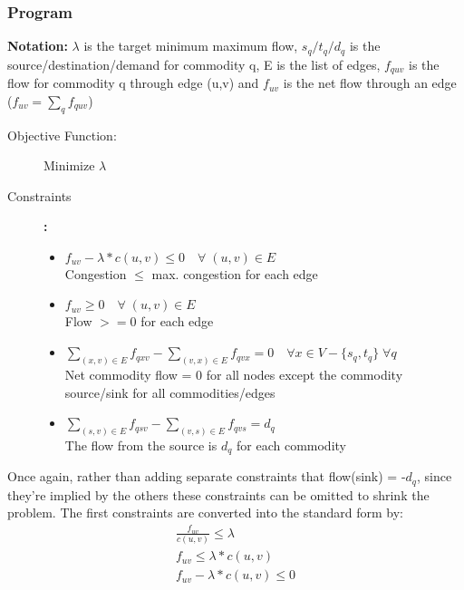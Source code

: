 \subsubsection{Program}
\textbf{Notation:} $\lambda$ is the target minimum maximum flow, $s_q/t_q/d_q$ is the source/destination/demand for commodity q, E is the list of edges, $f_{quv}$ is the flow for commodity q through edge (u,v) and $f_{uv}$ is the net flow through an edge ($f_{uv} = \sum_qf_{quv}$)
\begin{description}
\item [Objective Function:] Minimize $\lambda$
\item [Constraints]\textbf{:}  
\begin{itemize}
    \item \(f_{uv} - \lambda * c(u,v)  \leq 0 \quad \forall \;(u,v) \in E\) \\ Congestion $\leq$ max. congestion for each edge
    \item \(f_{uv} \geq 0 \quad \forall \;(u,v) \in E\) \\ Flow $>=0$ for each edge
    \item \(\sum_{(x,v)\in E} f_{qxv} - \sum_{(v,x)\in E} f_{qvx} = 0 \quad \forall x \in V-\{s_q,t_q\}\; \forall q \) \\ Net commodity flow = 0 for all nodes except the commodity source/sink for all commodities/edges
    \item \(\sum_{(s,v)\in E} f_{qsv} - \sum_{(v,s)\in E} f_{qvs} = d_q\) \\ The flow from the source is $d_q$ for each commodity
    \end{itemize}
\end{description}
Once again, rather than adding separate constraints that flow(sink) = -$d_q$, since they're implied by the others these constraints can be omitted to shrink the problem. The first constraints are converted into the standard form by:
\begin{align}
    \frac{f_{uv}}{c(u,v)} \leq \lambda \nonumber \\
    f_{uv} \leq \lambda * c(u,v) \nonumber \\
    f_{uv} - \lambda * c(u,v) \leq 0 \nonumber
\end{align}
